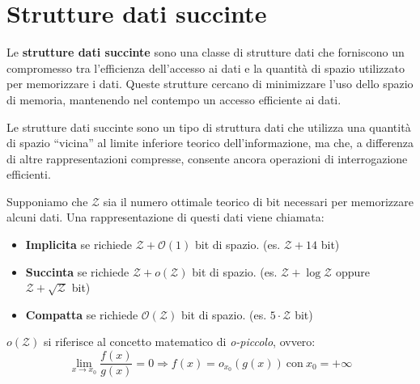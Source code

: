 \chapter{Strutture dati succinte}
Le \textbf{strutture dati succinte} sono una classe di strutture dati che forniscono
un compromesso tra l'efficienza dell'accesso ai dati e la quantità di spazio
utilizzato per memorizzare i dati. Queste strutture cercano di minimizzare l'uso
dello spazio di memoria, mantenendo nel contempo un accesso efficiente ai dati.

Le strutture dati succinte sono un tipo di struttura dati che utilizza una quantità
di spazio “vicina” al limite inferiore teorico dell'informazione, ma che, a
differenza di altre rappresentazioni compresse, consente ancora operazioni di
interrogazione efficienti.

Supponiamo che $\mathcal{Z}$ sia il numero ottimale teorico di bit necessari per
memorizzare alcuni dati. Una rappresentazione di questi dati viene chiamata:
\begin{itemize}
    \item \textbf{Implicita} se richiede $\mathcal{Z} + \mathcal{O}(1)$ bit di
          spazio. (es. $\mathcal{Z} + 14$ bit)
    \item \textbf{Succinta} se richiede $\mathcal{Z} + o(\mathcal{Z})$ bit di spazio.
          (es. $\mathcal{Z} + \log \mathcal{Z}$ oppure $\mathcal{Z} + \sqrt{
                  \mathcal{Z}}$ bit)
    \item \textbf{Compatta} se richiede $\mathcal{O}(\mathcal{Z})$ bit di spazio.
          (es. $5 \cdot \mathcal{Z}$ bit)
\end{itemize}
\begin{nota}
    $o(\mathcal{Z})$ si riferisce al concetto matematico di \textit{o-piccolo},
    ovvero:
    \begin{equation}
        \lim_{x \to x_0} \frac{f(x)}{g(x)} = 0 \Rightarrow f(x) = o_{x_0} (g(x))
        \ \text{con} \ x_0 = + \infty
    \end{equation}
\end{nota}
